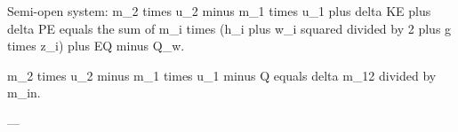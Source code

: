 Semi-open system:  
m_2 times u_2 minus m_1 times u_1 plus delta KE plus delta PE equals the sum of m_i times (h_i plus w_i squared divided by 2 plus g times z_i) plus EQ minus Q_w.  

m_2 times u_2 minus m_1 times u_1 minus Q equals delta m_12 divided by m_in.  

---